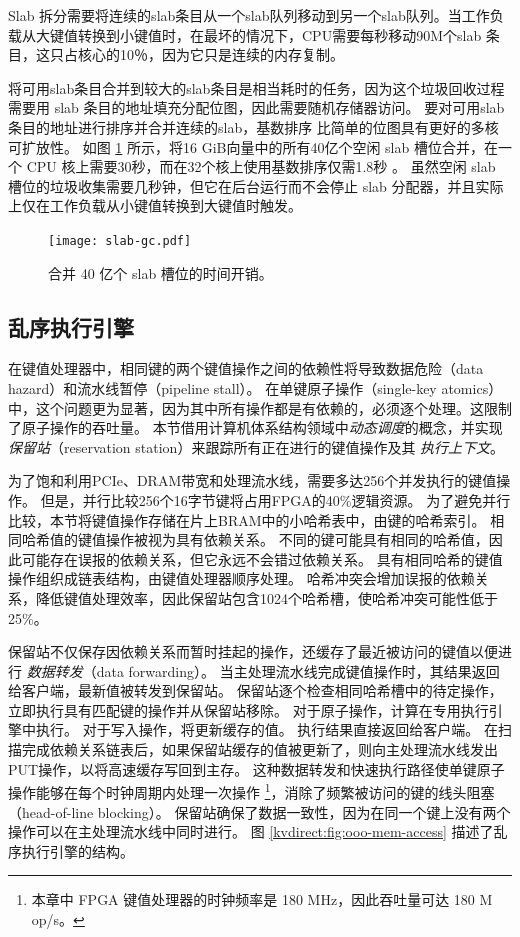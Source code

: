 Slab 拆分需要将连续的slab条目从一个slab队列移动到另一个slab队列。当工作负载从大键值转换到小键值时，在最坏的情况下，CPU需要每秒移动90M个slab 条目，这只占核心的10％，因为它只是连续的内存复制。

将可用slab条目合并到较大的slab条目是相当耗时的任务，因为这个垃圾回收过程需要用 slab 条目的地址填充分配位图，因此需要随机存储器访问。
要对可用slab条目的地址进行排序并合并连续的slab，基数排序 \cite {satish2010fast} 比简单的位图具有更好的多核可扩放性。
如图 \ref {kvdirect:fig:slab-garbage-collection} 所示，将16 GiB向量中的所有40亿个空闲 slab 槽位合并，在一个 CPU 核上需要30秒，而在32个核上使用基数排序仅需1.8秒 \cite{satish2010fast}。
虽然空闲 slab 槽位的垃圾收集需要几秒钟，但它在后台运行而不会停止 slab 分配器，并且实际上仅在工作负载从小键值转换到大键值时触发。


\begin{figure}[t]
	\centering
	\texttt{[image: slab-gc.pdf]}
	\caption{合并 40 亿个 slab 槽位的时间开销。}
	\label{kvdirect:fig:slab-garbage-collection}
\end{figure}




\subsection{乱序执行引擎}
\label{kvdirect:sec:ooo}

在键值处理器中，相同键的两个键值操作之间的依赖性将导致数据危险（data hazard）和流水线暂停（pipeline stall）。
在单键原子操作（single-key atomics）中，这个问题更为显著，因为其中所有操作都是有依赖的，必须逐个处理。这限制了原子操作的吞吐量。
本节借用计算机体系结构领域中\textit{动态调度}的概念，并实现 \textit {保留站}（reservation station）来跟踪所有正在进行的键值操作及其 \textit {执行上下文}。

为了饱和利用PCIe、DRAM带宽和处理流水线，需要多达256个并发执行的键值操作。
但是，并行比较256个16字节键将占用FPGA的40\%逻辑资源。
为了避免并行比较，本节将键值操作存储在片上BRAM中的小哈希表中，由键的哈希索引。
相同哈希值的键值操作被视为具有依赖关系。
不同的键可能具有相同的哈希值，因此可能存在误报的依赖关系，但它永远不会错过依赖关系。
具有相同哈希的键值操作组织成链表结构，由键值处理器顺序处理。
哈希冲突会增加误报的依赖关系，降低键值处理效率，因此保留站包含1024个哈希槽，使哈希冲突可能性低于25\%。

保留站不仅保存因依赖关系而暂时挂起的操作，还缓存了最近被访问的键值以便进行 \textit {数据转发}（data forwarding）。
当主处理流水线完成键值操作时，其结果返回给客户端，最新值被转发到保留站。
保留站逐个检查相同哈希槽中的待定操作，立即执行具有匹配键的操作并从保留站移除。
对于原子操作，计算在专用执行引擎中执行。
对于写入操作，将更新缓存的值。
执行结果直接返回给客户端。
在扫描完成依赖关系链表后，如果保留站缓存的值被更新了，则向主处理流水线发出PUT操作，以将高速缓存写回到主存。
这种数据转发和快速执行路径使单键原子操作能够在每个时钟周期内处理一次操作 \footnote{本章中 FPGA 键值处理器的时钟频率是 180 MHz，因此吞吐量可达 180 M op/s。}，消除了频繁被访问的键的线头阻塞（head-of-line blocking）。
保留站确保了数据一致性，因为在同一个键上没有两个操作可以在主处理流水线中同时进行。
图 \ref{kvdirect:fig:ooo-mem-access} 描述了乱序执行引擎的结构。

